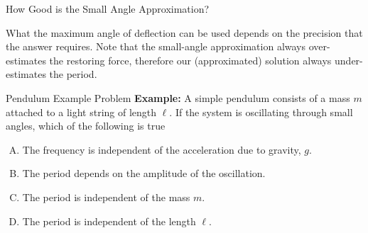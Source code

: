 \documentclass[12pt,compress,aspectratio=169]{beamer}
\begin{document}
\begin{frame}{How Good is the Small Angle Approximation?}
  \begin{center}
  \end{center}
  What the maximum angle of deflection can be used depends on the precision
  that the answer requires. Note that the small-angle approximation always
  over-estimates the restoring force, therefore our (approximated) solution
  always under-estimates the period.
\end{frame}



\begin{frame}{Pendulum Example Problem}
  \textbf{Example:} A simple pendulum consists of a mass $m$ attached to a
  light string of length $\ell$. If the system is oscillating through small
  angles, which of the following is true
  \begin{enumerate}[(A)]
  \item The frequency is independent of the acceleration due to gravity, $g$.
  \item The period depends on the amplitude of the oscillation.
  \item The period is independent of the mass $m$.
  \item The period is independent of the length $\ell$.
  \end{enumerate}
\end{frame}
\end{document}
